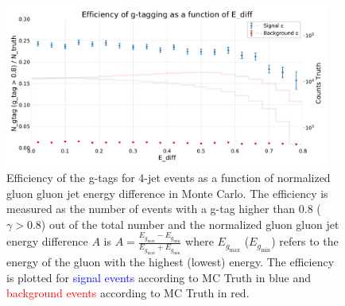 \documentclass[a4paper, twoside, nobib]{tufte-book}
\begin{document}
\begin{figure}
  \includegraphics[width=0.95\textwidth, trim=0 0 0 40, clip, page=1]{figures/quarks/efficiency_events-down_sample=1.00-ML_vars=vertex-selection=b-ejet_min=4-n_iter_RS_lgb=99-n_iter_RS_xgb=9-cdot_cut=0.90-version=19-njet=4.pdf}
  \caption[g-Tagging efficiency for 4-jet events in MC as a function of normalized gluon gluon jet energy difference]
          {Efficiency of the g-tags for 4-jet events as a function of normalized gluon gluon jet energy difference in Monte Carlo. The efficiency is measured as the number of events with a g-tag higher than 0.8 ($\gamma > 0.8$) out of the total number and the normalized gluon gluon jet energy difference $A$ is $A=\frac{E_{g_\mathrm{max}}-E_{g_\mathrm{min}}}{E_{g_\mathrm{max}}+E_{g_\mathrm{min}}}$ where $E_{g_\mathrm{max}}$ ($E_{g_\mathrm{min}}$) refers to the energy of the gluon with the highest (lowest) energy. The efficiency is plotted for \textcolor{blue}{signal events} according to MC Truth in blue and \textcolor{red}{background events} according to MC Truth in red.
          } 
  \label{fig:q:effiency_gtag_E_diff}
\end{figure}
\end{document}
